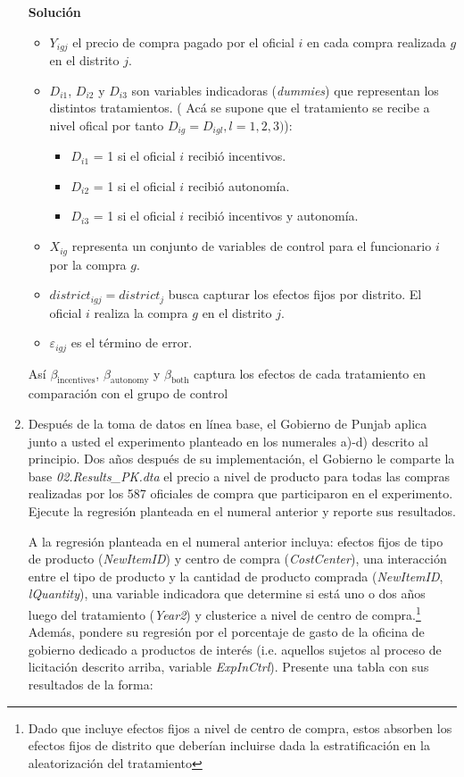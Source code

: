 \documentclass[a4paper, answers, addpoints, 11pt]{exam}
\newenvironment{solucion}{%
  \begin{mdframed}[
    backgroundcolor=blue!5,    %
    linecolor=blue!50,          %
    linewidth=2pt,              %
    leftmargin=10pt,            %
    rightmargin=8pt,           %
    topline=true,              %
    bottomline=true,            %
    roundcorner=10pt,           %
    innerleftmargin=10pt,       %
    innerrightmargin=10pt,      %
    innerbottommargin=10pt,     %
    innertopmargin=10pt         %
  ]%
  \begin{tcolorbox}[colframe=blue!50!black, colback=blue!50, coltitle=white, sharp corners=all, boxrule=1mm, width=\textwidth, halign=left, valign=center, top=0mm, bottom=0mm, left=0mm, right=0mm] \textbf{Solución} \end{tcolorbox} }{\end{mdframed}}
\begin{document}
\begin{enumerate}
\begin{solucion}
\begin{itemize}
    \item \( Y_{igj} \) el precio de compra pagado por el oficial $i$ en cada compra realizada  $g$ en el distrito $j$.
    \item \( D_{i1} \), \( D_{i2} \) y \( D_{i3} \) son variables indicadoras (\textit{dummies}) que representan los distintos tratamientos. ( Acá se supone que el tratamiento se recibe a nivel ofical por tanto \( D_{ig} =  D_{igl} , l=1,2,3)\)):
        \begin{itemize}
            \item \( D_{i1} \) = 1 si el oficial \( i \) recibió incentivos.
            \item \( D_{i2} \) = 1 si el oficial \( i \) recibió autonomía.
            \item \( D_{i3} \) = 1 si el oficial \( i \) recibió incentivos y autonomía.
        \end{itemize}
    \item \( X_{ig} \) representa un conjunto de variables de control para el funcionario \( i \) por la compra \( g \).
    
    \item \( district_{igj} = district_{j} \) busca capturar los efectos fijos por distrito. El oficial \( i \) realiza la compra \( g \) en el distrito \( j \).
    \item \( \varepsilon_{igj} \) es el término de error.
\end{itemize}
Así \( \beta_{\text{incentives}} \), \( \beta_{\text{autonomy}} \) y \( \beta_{\text{both}} \) captura los efectos de cada tratamiento en comparación con el grupo de control
   \end{solucion}


   \item Después de la toma de datos en línea base, el Gobierno de Punjab aplica junto a usted el experimento planteado en los numerales a)-d) descrito al principio. Dos años después de su implementación, el Gobierno le comparte la base \textit{02.Results\_PK.dta} el precio a nivel de producto para todas las compras realizadas por los 587 oficiales de compra que participaron en el experimento. Ejecute la regresión planteada en el numeral anterior y reporte sus resultados.
   
   \bigbreak A la regresión planteada en el numeral anterior incluya: efectos fijos de tipo de producto (\textit{NewItemID}) y centro de compra (\textit{CostCenter}), una interacción entre el tipo de producto y la cantidad de producto comprada (\textit{NewItemID}, \textit{lQuantity}), una variable indicadora que determine si está uno o dos años luego del tratamiento (\textit{Year2}) y clusterice a nivel de centro de compra.\footnote{\footnotesize{Dado que incluye efectos fijos a nivel de centro de compra, estos absorben los efectos fijos de distrito que deberían incluirse dada la estratificación en la aleatorización del tratamiento}} Además, pondere su regresión por el porcentaje de gasto de la oficina de gobierno dedicado a productos de interés (i.e. aquellos sujetos al proceso de licitación descrito arriba, variable \textit{ExpInCtrl}). Presente una tabla con sus resultados de la forma:


\end{enumerate}
\end{document}
